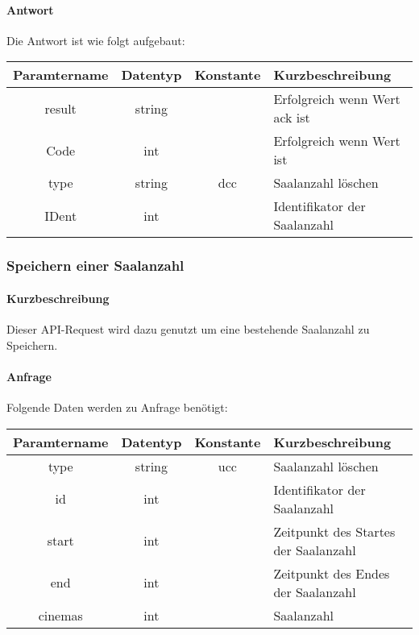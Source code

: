 \paragraph{Antwort}Die Antwort ist wie folgt aufgebaut:
\begin{table}[H]
	\begin{tabular}{|c|c|c|p{6.5cm}|}
		\hline
		\textbf{Paramtername} & \textbf{Datentyp} & \textbf{Konstante} & \textbf{Kurzbeschreibung}                                                                                               \\ \hline
		result              & string           &                 & Erfolgreich wenn Wert {\glqq ack\grqq} ist \\ \hline
		Code                & int              &                 & Erfolgreich wenn Wert {\glqq 0\grqq} ist \\ \hline
		type                & string           & dcc             & Saalanzahl löschen \\ \hline
		IDent               & int              &                 & Identifikator der Saalanzahl \\ \hline
	\end{tabular}
\end{table}
\subsubsection{Speichern einer Saalanzahl}
\paragraph{Kurzbeschreibung}Dieser API-Request wird dazu genutzt um eine bestehende Saalanzahl zu Speichern.
\paragraph{Anfrage}Folgende Daten werden zu Anfrage benötigt:
\begin{table}[H]
	\begin{tabular}{|c|c|c|p{6.5cm}|}
		\hline
		\textbf{Paramtername} & \textbf{Datentyp} & \textbf{Konstante} & \textbf{Kurzbeschreibung}                                                                                               \\ \hline
		type                & string            & ucc                & Saalanzahl löschen \\ \hline
		id                  & int               &                    & Identifikator der Saalanzahl \\ \hline
		start               & int               &                    & Zeitpunkt des Startes der Saalanzahl \\ \hline
		end                 & int               &                    & Zeitpunkt des Endes der Saalanzahl \\ \hline
		cinemas             & int               &                    & Saalanzahl \\ \hline
	\end{tabular}
\end{table}
